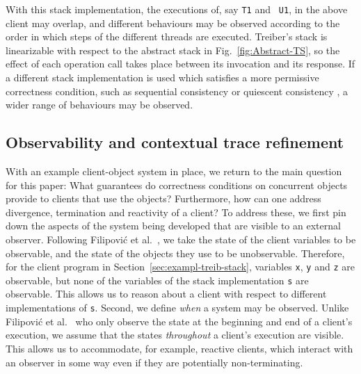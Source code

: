 \documentclass[11pt]{llncs}
\newcommand{\reffig}[1]{Fig.~\ref{#1}}
\newcommand{\refsec}[1]{Section~\ref{#1}}
\begin{document}
With this stack implementation, the executions of, say {\tt T1} and {\tt
  U1}, in the above client may overlap, and different behaviours may
be observed according to the order in which steps of the different
threads are executed.  Treiber's stack is linearizable with respect to
the abstract stack in \reffig{fig:Abstract-TS}, so the effect of each
operation call takes place between its invocation and its response.
If a different stack implementation is used which satisfies a more
permissive correctness condition, such as sequential consistency or
quiescent consistency \cite{HeSh08}, a wider range of behaviours may
be observed.

























\vspace{-1mm}



\subsection{Observability and contextual trace refinement}






With an example client-object system in place, we return to the main
question for this paper: What guarantees do correctness conditions on
concurrent objects provide to clients that use the objects?
Furthermore, how can one address divergence, termination and
reactivity of a client? To address these, we first pin down the
aspects of the system being developed that are visible to an external
observer. Following Filipovi\'{c} et al.\ \cite{FORY10}, we take the
state of the client variables to be observable, and the state of the
objects they use to be
unobservable. Therefore, for the client program in \refsec{sec:exampl-treib-stack},
variables {\tt x}, {\tt y} and {\tt z} are observable, but none of the
variables of the stack implementation {\tt s} are observable. This
allows us to reason about a client with respect to different
implementations of {\tt s}.  Second, we define \emph{when} a system
may be observed. Unlike Filipovi\'{c} et al.\ \cite{FORY10} who only
observe the state at the beginning and end of a client's execution, we
assume that the states \emph{throughout} a client's execution are
visible. This allows us to accommodate, for example, reactive clients,
which interact with an observer in some way even if they are
potentially non-terminating.
\end{document}
